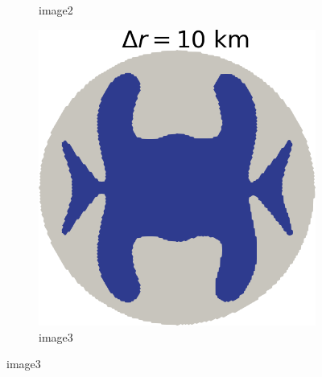 \documentclass{article}
\begin{document}
\begin{figure}[!h]
\begin{subfigure}{0.25\textwidth}
		\caption{image2}
		\label{fig:2}
	\end{subfigure}\hfil %
	\begin{subfigure}{0.25\textwidth}
		\includegraphics[width=\linewidth]{../fig/Grounded_zone_10km.png}
		\caption{image3}
		\label{fig:3}
	\end{subfigure}
	

\end{figure}
\end{document}
